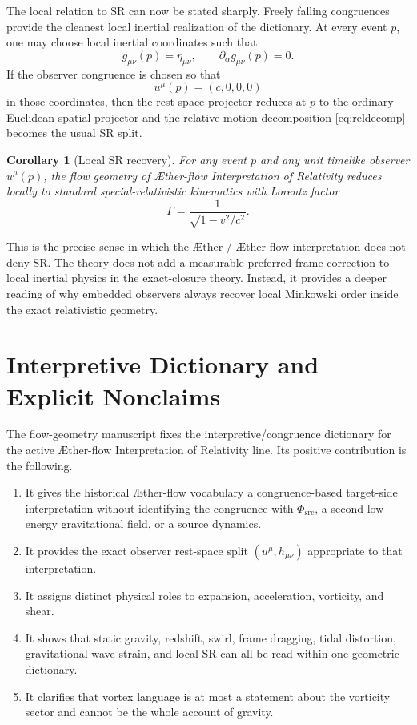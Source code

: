 \documentclass[11pt]{article}
\newcommand{\Aether}{\AE{}ther}
\newcommand{\Aflow}{\AE{}ther-flow}
\newcommand{\TheoryName}{\Aflow{} Interpretation of Relativity}
\newcommand{\PhiSrc}{\Phi_{\mathrm{src}}}
\newtheorem{corollary}{Corollary}
\begin{document}
The local relation to SR can now be stated sharply. Freely falling congruences provide the cleanest local inertial realization of the dictionary. At every event \(p\), one may choose local inertial coordinates such that
\begin{equation}
g_{\mu\nu}(p)=\eta_{\mu\nu},
\qquad
\partial_\alpha g_{\mu\nu}(p)=0.
\label{eq:localinertial}
\end{equation}
If the observer congruence is chosen so that
\begin{equation}
u^\mu(p)=(c,0,0,0)
\label{eq:localobserver}
\end{equation}
in those coordinates, then the rest-space projector reduces at \(p\) to the ordinary Euclidean spatial projector and the relative-motion decomposition \eqref{eq:reldecomp} becomes the usual SR split.

\begin{corollary}[Local SR recovery]
For any event \(p\) and any unit timelike observer \(u^\mu(p)\), the flow geometry of \TheoryName{} reduces locally to standard special-relativistic kinematics with Lorentz factor
\begin{equation}
\Gamma=\frac{1}{\sqrt{1-v^2/c^2}}.
\label{eq:localsr}
\end{equation}
\end{corollary}

This is the precise sense in which the \Aether{} / \Aflow{} interpretation does not deny SR. The theory does not add a measurable preferred-frame correction to local inertial physics in the exact-closure theory. Instead, it provides a deeper reading of why embedded observers always recover local Minkowski order inside the exact relativistic geometry.

\section{Interpretive Dictionary and Explicit Nonclaims}

The flow-geometry manuscript fixes the interpretive/congruence dictionary for the active \TheoryName{} line. Its positive contribution is the following.
\begin{enumerate}
    \item It gives the historical \Aflow{} vocabulary a congruence-based target-side interpretation without identifying the congruence with \(\PhiSrc\), a second low-energy gravitational field, or a source dynamics.
    \item It provides the exact observer rest-space split \((u^\mu,h_{\mu\nu})\) appropriate to that interpretation.
    \item It assigns distinct physical roles to expansion, acceleration, vorticity, and shear.
    \item It shows that static gravity, redshift, swirl, frame dragging, tidal distortion, gravitational-wave strain, and local SR can all be read within one geometric dictionary.
    \item It clarifies that vortex language is at most a statement about the vorticity sector and cannot be the whole account of gravity.
\end{enumerate}
\end{document}
